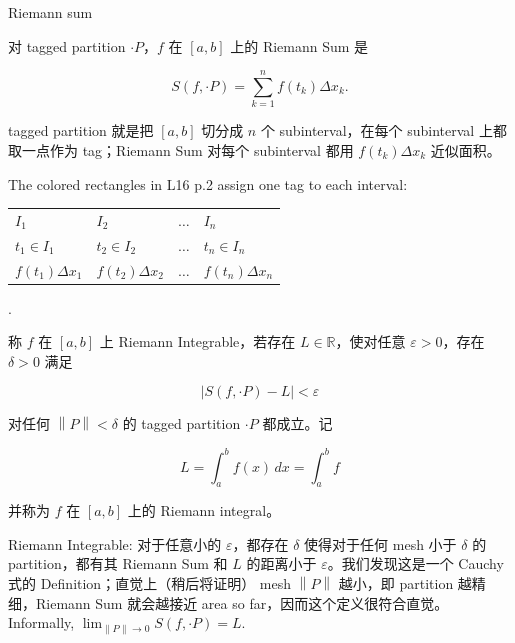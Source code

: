 \begin{definition}{Riemann sum}

对 tagged partition \(\cdot P\)，\(f\) 在 \(\left\lbrack {a,b} \right\rbrack\) 上的 Riemann Sum 是

\[S\left( {f, \cdot P} \right) = \sum\limits_{k = 1}^{n}f\left( t_{k} \right)\Delta x_{k}.\]

tagged partition 就是把 \(\left\lbrack {a,b} \right\rbrack\) 切分成 \(n\) 个 subinterval，在每个 subinterval 上都取一点作为 tag；Riemann Sum 对每个 subinterval 都用 \(f\left( t_{k} \right)\Delta x_{k}\) 近似面积。

The colored rectangles in L16 p.2 assign one tag to each interval:

{\def\LTcaptype{none} %
\begin{longtable}[]{@{}llll@{}}
\toprule\noalign{}
\endhead
\bottomrule\noalign{}
\endlastfoot
\(I_{1}\) & \(I_{2}\) & \(\ldots\) & \(I_{n}\) \\
\(t_{1} \in I_{1}\) & \(t_{2} \in I_{2}\) & \(\ldots\) & \(t_{n} \in I_{n}\) \\
\(f\left( t_{1} \right)\Delta x_{1}\) & \(f\left( t_{2} \right)\Delta x_{2}\) & \(\ldots\) & \(f\left( t_{n} \right)\Delta x_{n}\) \\
\end{longtable}
}

.

\end{definition}

\begin{definition}{}

称 \(f\) 在 \(\left\lbrack {a,b} \right\rbrack\) 上 Riemann Integrable，若存在 \(L \in \mathbb{R}\)，使对任意 \(\varepsilon > 0\)，存在 \(\delta > 0\) 满足

\[\left| {S\left( {f, \cdot P} \right) - L} \right| < \varepsilon\]

对任何 \(\left\| P \right\| < \delta\) 的 tagged partition \(\cdot P\) 都成立。记

\[L = \int_{a}^{b}f(x)\, dx = \int_{a}^{b}f\]

并称为 \(f\) 在 \(\left\lbrack {a,b} \right\rbrack\) 上的 Riemann integral。

Riemann Integrable: 对于任意小的 \(\varepsilon\)，都存在 \(\delta\) 使得对于任何 mesh 小于 \(\delta\) 的 partition，都有其 Riemann Sum 和 \(L\) 的距离小于 \(\varepsilon\)。我们发现这是一个 Cauchy 式的 Definition；直觉上（稍后将证明） mesh \(\left\| P \right\|\) 越小，即 partition 越精细，Riemann Sum 就会越接近 area so far，因而这个定义很符合直觉。Informally, \(\lim_{{\| P\|}\rightarrow 0}S\left( {f, \cdot P} \right) = L\).

\end{definition}

